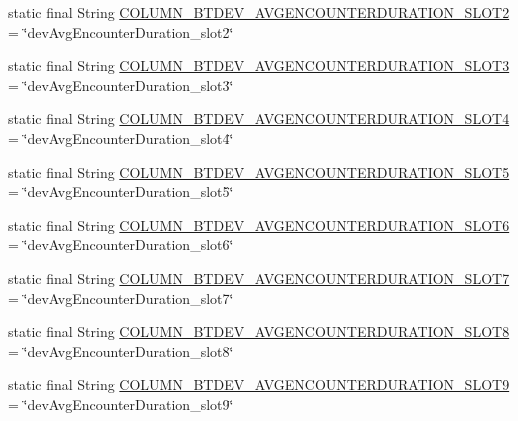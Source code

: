\begin{DoxyCompactItemize}
\item 
static final String \hyperlink{classcom_1_1social_1_1proximity_1_1_s_q_lite_helper_a14c609ceff4a243797ac0ed38180c76b}{C\+O\+L\+U\+M\+N\+\_\+\+B\+T\+D\+E\+V\+\_\+\+A\+V\+G\+E\+N\+C\+O\+U\+N\+T\+E\+R\+D\+U\+R\+A\+T\+I\+O\+N\+\_\+\+S\+L\+O\+T2} = \char`\"{}dev\+Avg\+Encounter\+Duration\+\_\+slot2\char`\"{}
\item 
static final String \hyperlink{classcom_1_1social_1_1proximity_1_1_s_q_lite_helper_ac9ee299066e1659d2f00c7ac7b070c01}{C\+O\+L\+U\+M\+N\+\_\+\+B\+T\+D\+E\+V\+\_\+\+A\+V\+G\+E\+N\+C\+O\+U\+N\+T\+E\+R\+D\+U\+R\+A\+T\+I\+O\+N\+\_\+\+S\+L\+O\+T3} = \char`\"{}dev\+Avg\+Encounter\+Duration\+\_\+slot3\char`\"{}
\item 
static final String \hyperlink{classcom_1_1social_1_1proximity_1_1_s_q_lite_helper_a747c8f6e90116d66c055fdbaba96d56e}{C\+O\+L\+U\+M\+N\+\_\+\+B\+T\+D\+E\+V\+\_\+\+A\+V\+G\+E\+N\+C\+O\+U\+N\+T\+E\+R\+D\+U\+R\+A\+T\+I\+O\+N\+\_\+\+S\+L\+O\+T4} = \char`\"{}dev\+Avg\+Encounter\+Duration\+\_\+slot4\char`\"{}
\item 
static final String \hyperlink{classcom_1_1social_1_1proximity_1_1_s_q_lite_helper_a32dd31dc2a2bda82dd9673a33a2e4aac}{C\+O\+L\+U\+M\+N\+\_\+\+B\+T\+D\+E\+V\+\_\+\+A\+V\+G\+E\+N\+C\+O\+U\+N\+T\+E\+R\+D\+U\+R\+A\+T\+I\+O\+N\+\_\+\+S\+L\+O\+T5} = \char`\"{}dev\+Avg\+Encounter\+Duration\+\_\+slot5\char`\"{}
\item 
static final String \hyperlink{classcom_1_1social_1_1proximity_1_1_s_q_lite_helper_a86b01514c7e56288d280557e605f5d7b}{C\+O\+L\+U\+M\+N\+\_\+\+B\+T\+D\+E\+V\+\_\+\+A\+V\+G\+E\+N\+C\+O\+U\+N\+T\+E\+R\+D\+U\+R\+A\+T\+I\+O\+N\+\_\+\+S\+L\+O\+T6} = \char`\"{}dev\+Avg\+Encounter\+Duration\+\_\+slot6\char`\"{}
\item 
static final String \hyperlink{classcom_1_1social_1_1proximity_1_1_s_q_lite_helper_a7ead17ba779351a033117f59e833b2fe}{C\+O\+L\+U\+M\+N\+\_\+\+B\+T\+D\+E\+V\+\_\+\+A\+V\+G\+E\+N\+C\+O\+U\+N\+T\+E\+R\+D\+U\+R\+A\+T\+I\+O\+N\+\_\+\+S\+L\+O\+T7} = \char`\"{}dev\+Avg\+Encounter\+Duration\+\_\+slot7\char`\"{}
\item 
static final String \hyperlink{classcom_1_1social_1_1proximity_1_1_s_q_lite_helper_a15bba1730515628bc4aff17ec1d8c9c4}{C\+O\+L\+U\+M\+N\+\_\+\+B\+T\+D\+E\+V\+\_\+\+A\+V\+G\+E\+N\+C\+O\+U\+N\+T\+E\+R\+D\+U\+R\+A\+T\+I\+O\+N\+\_\+\+S\+L\+O\+T8} = \char`\"{}dev\+Avg\+Encounter\+Duration\+\_\+slot8\char`\"{}
\item 
static final String \hyperlink{classcom_1_1social_1_1proximity_1_1_s_q_lite_helper_a671f0ef4fc52b1a396356de9b080dd05}{C\+O\+L\+U\+M\+N\+\_\+\+B\+T\+D\+E\+V\+\_\+\+A\+V\+G\+E\+N\+C\+O\+U\+N\+T\+E\+R\+D\+U\+R\+A\+T\+I\+O\+N\+\_\+\+S\+L\+O\+T9} = \char`\"{}dev\+Avg\+Encounter\+Duration\+\_\+slot9\char`\"{}

\end{DoxyCompactItemize}
